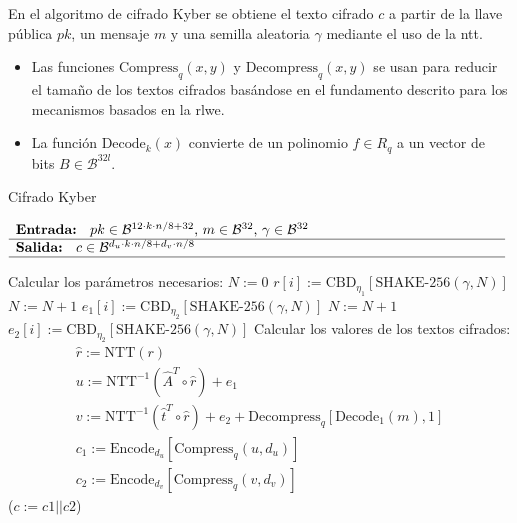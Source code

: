 En el algoritmo de cifrado Kyber se obtiene el texto cifrado \(c\) a partir de la llave pública \(pk\), un mensaje \(m\) y una semilla aleatoria \(\gamma\) mediante el uso de la \acrshort{ntt}.
\begin{itemize}
	\item Las funciones $\text{Compress}_q(x,y)$ y $\text{Decompress}_q(x,y)$ se usan para reducir el tamaño de los textos cifrados basándose en el fundamento descrito para los mecanismos basados en la \acrshort{rlwe}. 
	\item La función $\text{Decode}_k(x)$  convierte de un polinomio \(f\in R_q\) a un vector de bits \(B\in\mathcal{B}^{32l}\).
\end{itemize}
\newpage
\begin{algorithm}[H]
	\caption{Cifrado Kyber}
	$\begin{array}{p{\textwidth}}
		\textbf{Entrada: } \(pk\in \mathcal{B}^{12\cdot k\cdot n/8+32}\), \(m\in \mathcal{B}^{32}\), \(\gamma\in \mathcal{B}^{32}\)\\ 
		\hline
		\textbf{Salida: } \(c\in \mathcal{B}^{d_u\cdot k\cdot n/8+d_v\cdot n/8}\)\\ 
		\hline
	\end{array}$
	\begin{algorithmic}[1]
		\State Calcular los parámetros necesarios:
		\State \(N:=0\)
		\State $r[i]:= \text{CBD}_{\eta_1}[\text{SHAKE-256}(\gamma,N)]$ 
		\State $N:= N+1$
		\EndFor
		\State $e_1[i]:= \text{CBD}_{\eta_2}[\text{SHAKE-256}(\gamma,N)]$ 
		\State $N:= N+1$
		\EndFor
		\State \(e_2[i]:= \text{CBD}_{\eta_2}[\text{SHAKE-256}(\gamma,N)]\) 
		\State Calcular los valores de los textos cifrados:
		\begin{equation}
			\begin{array}{l}
				\hat{r}:=\text{NTT}(r)\\
				u:= \text{NTT}^{-1}(\hat{A}^T\circ \hat{r})+e_1\\
				v:=\text{NTT}^{-1}(\hat{t}^T\circ \hat{r})+e_2+ \text{Decompress}_q[\text{Decode}_1(m),1]\\
				c_1:=\text{Encode}_{d_u}[\text{Compress}_q(u,d_u)]\\
				c_2:=\text{Encode}_{d_v}[\text{Compress}_q(v,d_v)]
			\end{array}
		\end{equation}
		\State \Return (\(c:=c1||c2\))
	\end{algorithmic}
\end{algorithm}


